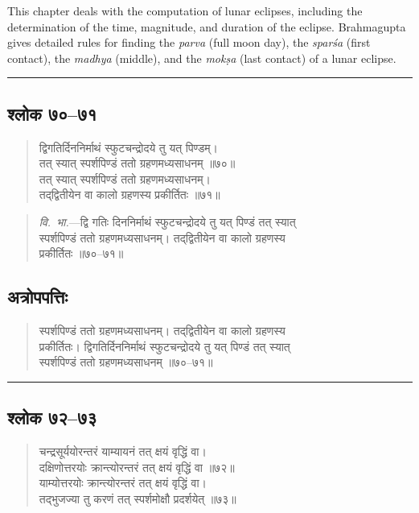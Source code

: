 \documentclass[11pt,a4paper]{article}
\newcommand{\longline}{\noindent\rule{\textwidth}{0.4pt}}
\newcommand{\dev}[1]{{\devanagarifont #1}}
\newenvironment{shloka}{%
  \begin{quote}
  \small
  \setlength{\leftmargin}{2em}
  \devanagarifont
}{\end{quote}}
\newenvironment{vyakhya}{%
  \begin{quote}
  \small
  \setlength{\leftmargin}{1em}
  \devanagarifont
}{\end{quote}}
\newcommand{\skt}[1]{{\devanagarifont #1}}
\begin{document}
This chapter deals with the computation of lunar eclipses, including the determination of the time, magnitude, and duration of the eclipse. Brahmagupta gives detailed rules for finding the \textit{parva} (full moon day), the \textit{sparśa} (first contact), the \textit{madhya} (middle), and the \textit{mokṣa} (last contact) of a lunar eclipse.

\longline

\subsection{\dev{श्लोक ७०--७१}}

\begin{shloka}
\skt{द्विगतिर्दिननिर्माथं स्फुटचन्द्रोदये तु यत् पिण्डम्।}\\
\skt{तत् स्यात् स्पर्शपिण्डं ततो ग्रहणमध्यसाधनम् ॥७०॥}\\[0.3em]
\skt{तत् स्यात् स्पर्शपिण्डं ततो ग्रहणमध्यसाधनम्।}\\
\skt{तद्‌द्वितीयेन वा कालो ग्रहणस्य प्रकीर्तितः ॥७१॥}
\end{shloka}

\begin{vyakhya}
\textit{वि.\ भा.}—\skt{द्वि गतिः दिननिर्माथं स्फुटचन्द्रोदये तु यत् पिण्डं तत् स्यात्}\\
\skt{स्पर्शपिण्डं ततो ग्रहणमध्यसाधनम्। तद्‌द्वितीयेन वा कालो ग्रहणस्य}\\
\skt{प्रकीर्तितः ॥७०--७१॥}
\end{vyakhya}

\subsection{\dev{अत्रोपपत्तिः}}

\begin{vyakhya}
\skt{स्पर्शपिण्डं ततो ग्रहणमध्यसाधनम्। तद्‌द्वितीयेन वा कालो ग्रहणस्य}\\
\skt{प्रकीर्तितः। द्विगतिर्दिननिर्माथं स्फुटचन्द्रोदये तु यत् पिण्डं तत् स्यात्}\\
\skt{स्पर्शपिण्डं ततो ग्रहणमध्यसाधनम् ॥७०--७१॥}
\end{vyakhya}

\longline

\subsection{\dev{श्लोक ७२--७३}}

\begin{shloka}
\skt{चन्द्रसूर्ययोरन्तरं याम्यायनं तत् क्षयं वृद्धिं वा।}\\
\skt{दक्षिणोत्तरयोः क्रान्त्योरन्तरं तत् क्षयं वृद्धिं वा ॥७२॥}\\[0.3em]
\skt{याम्योत्तरयोः क्रान्त्योरन्तरं तत् क्षयं वृद्धिं वा।}\\
\skt{तद्‌भुजज्या तु करणं तत् स्पर्शमोक्षौ प्रदर्शयेत् ॥७३॥}
\end{shloka}
\end{document}
